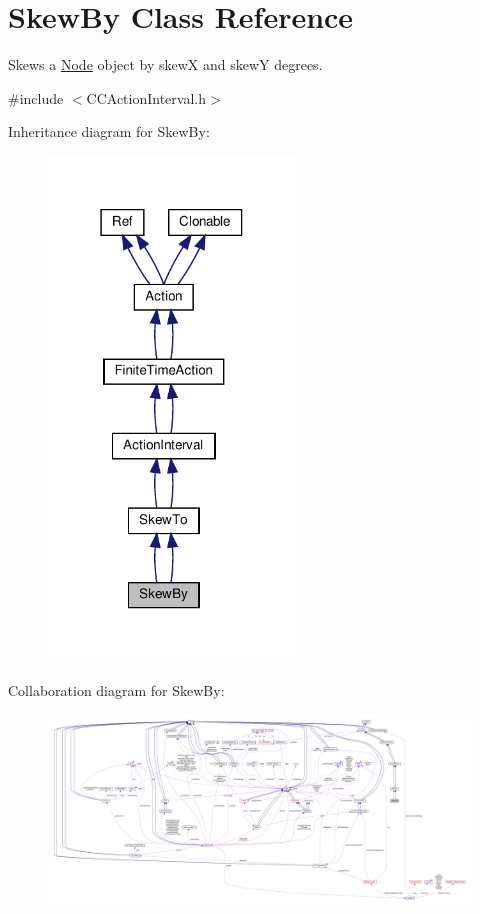 \hypertarget{classSkewBy}{}\section{Skew\+By Class Reference}
\label{classSkewBy}


Skews a \hyperlink{classNode}{Node} object by skewX and skewY degrees.  




{\ttfamily \#include $<$C\+C\+Action\+Interval.\+h$>$}



Inheritance diagram for Skew\+By\+:
\nopagebreak
\begin{figure}[H]
\begin{center}
\leavevmode
\includegraphics[width=186pt]{classSkewBy__inherit__graph}
\end{center}
\end{figure}


Collaboration diagram for Skew\+By\+:
\nopagebreak
\begin{figure}[H]
\begin{center}
\leavevmode
\includegraphics[width=350pt]{classSkewBy__coll__graph}
\end{center}
\end{figure}
